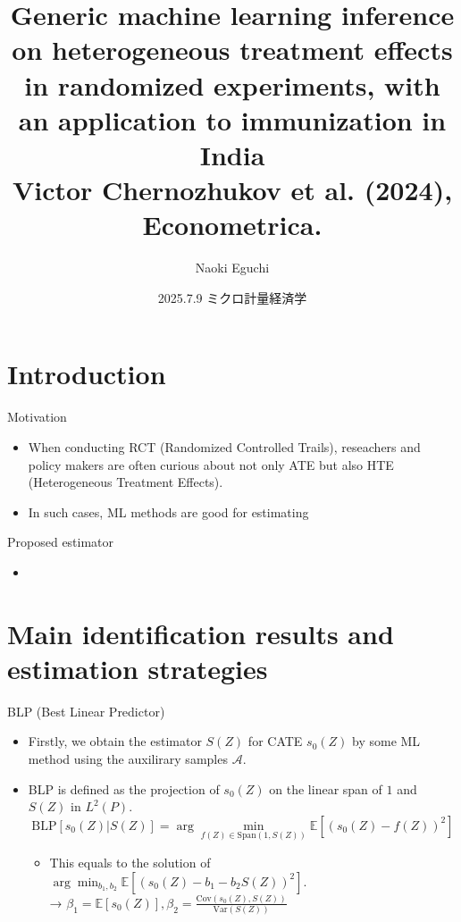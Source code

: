 \documentclass[xcolor=svgnames,aspectratio=169]{beamer}
\newcommand{\E}{\mathbb{E}}
\newcommand{\cov}{\text{Cov}}
\newcommand{\var}{\text{Var}}
\begin{document}
 

\title{Generic machine learning inference on heterogeneous treatment effects in randomized experiments, with an application to immunization in India \\ \small{Victor Chernozhukov et al. (2024), Econometrica.}}
\author{Naoki Eguchi}          
\date{2025.7.9 ミクロ計量経済学}

\begin{frame}                  
    \titlepage                     
\end{frame}

\section{Introduction}

\begin{frame}{Motivation}
    \begin{itemize}
        \item When conducting RCT (Randomized Controlled Trails), reseachers and policy makers are often curious about not only ATE but also HTE (Heterogeneous Treatment Effects).
        \item In such cases, ML methods are good for estimating
    \end{itemize}
\end{frame}

\begin{frame}{Proposed estimator}
    \begin{itemize}
        \item 
    \end{itemize}
\end{frame}

\section{Main identification results and estimation strategies}

\begin{frame}{BLP (Best Linear Predictor)}
    \begin{itemize}
        \item Firstly, we obtain the estimator $S(Z)$ for CATE $s_0(Z)$ by some ML method using the auxilirary samples $\mathcal{A} $.
        \item BLP is defined as the projection of $s_0(Z)$ on the linear span of $1$ and $S(Z)$ in $L^2(P)$.
        \[
        \text{BLP}[s_0(Z)|S(Z)]=\arg\min_{f(Z)\in \text{Span}(1,S(Z))}\E[(s_0(Z)-f(Z))^2]
        \]
        \begin{itemize}
            \item This equals to the solution of $\arg\min_{b_1,b_2}\E[(s_0(Z)-b_1-b_2 S(Z))^2]$. \\
            → $\beta_1=\E[s_0(Z)], \beta_2=\frac{\cov(s_0(Z),S(Z))}{\var(S(Z))}$
        \end{itemize}

    \end{itemize}
\end{frame}
\end{document}
